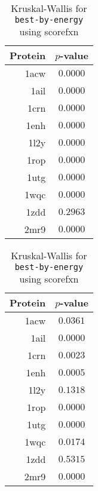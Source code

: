 \begin{table}
  \begin{minipage}{.5\linewidth}
  \centering
  \begin{tabular}{r|c}
  Protein & $p$-value \\ \hline \hline
  1acw & $\bm{0.0000}$ \\ \hline
  1ail & $\bm{0.0000}$ \\ \hline
  1crn & $\bm{0.0000}$ \\ \hline
  1enh & $\bm{0.0000}$ \\ \hline
  1l2y & $\bm{0.0000}$ \\ \hline
  1rop & $\bm{0.0000}$ \\ \hline
  1utg & $\bm{0.0000}$ \\ \hline
  1wqc & $\bm{0.0000}$ \\ \hline
  1zdd &     $0.2963$  \\ \hline
  2mr9 & $\bm{0.0000}$ \\ \hline
  \end{tabular}
  \caption{Kruskal-Wallis for \texttt{best-by-rmsd} using RMSD}
  \label{tab:kruskal-wallis-best-by-rmsd-RMSD}
  \end{minipage}
%
  \begin{minipage}{.5\linewidth}
  \centering
  \begin{tabular}{r|c}
  Protein & $p$-value \\ \hline \hline
  1acw & $\bm{0.0361}$ \\ \hline
  1ail & $\bm{0.0000}$ \\ \hline
  1crn & $\bm{0.0023}$ \\ \hline
  1enh & $\bm{0.0005}$ \\ \hline
  1l2y &     $0.1318$  \\ \hline
  1rop & $\bm{0.0000}$ \\ \hline
  1utg & $\bm{0.0000}$ \\ \hline
  1wqc & $\bm{0.0174}$ \\ \hline
  1zdd &     $0.5315$  \\ \hline
  2mr9 & $\bm{0.0000}$ \\ \hline
  \end{tabular}
  \caption{Kruskal-Wallis for \texttt{best-by-energy} using scorefxn}
  \label{tab:kruskal-wallis-best-by-energy-scorefxn}
  \end{minipage}
\end{table}